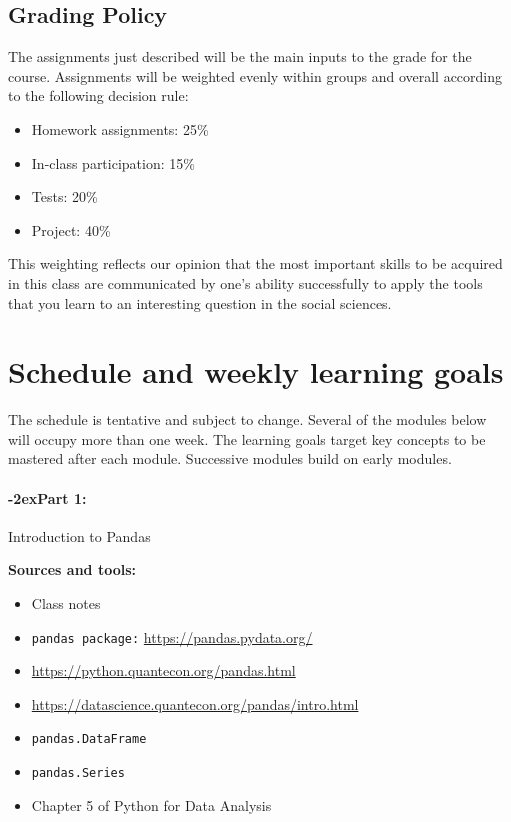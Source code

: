 \documentclass[11pt]{article}
\newcommand{\module}[1]{%
    \paragraph*{\kern-2ex\quad #1:}
  }
\begin{document}
  \subsection*{Grading Policy}

    The assignments just described will be the main inputs to the grade for the
    course. Assignments will be weighted evenly within groups and overall
    according to the following decision rule:

    \begin{itemize}
      \item Homework assignments: 25\%
      \item In-class participation: 15\%
      \item Tests: 20\%
      \item Project: 40\%
    \end{itemize}

    \noindent This weighting reflects our opinion that the most important skills
    to be  acquired in this class are communicated by one's ability successfully
    to apply the tools that you learn to an interesting question in the social
    sciences.

%
%
\newpage
\section*{Schedule and weekly learning goals}

  The schedule is tentative and subject to change. Several of the modules below will occupy more than one week.  The learning goals target
  key concepts to be mastered after each module. Successive modules build on early modules.

  \module{Part 1} Introduction to Pandas

  \bigskip

  {\bf Sources and tools:}
  \begin{itemize}
    \item Class notes
    \item \texttt{pandas package:} \url{https://pandas.pydata.org/}
    \item \url{https://python.quantecon.org/pandas.html}
    \item \url{https://datascience.quantecon.org/pandas/intro.html}
    \item \texttt{pandas.DataFrame}
    \item \texttt{pandas.Series}
    \item Chapter 5 of Python for Data Analysis
  \end{itemize}
\end{document}
